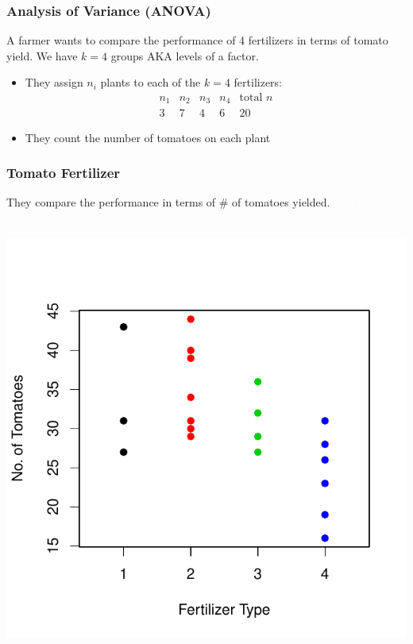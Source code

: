\documentclass[handout]{beamer}
\newcommand{\blue}[1]{\textcolor{blue2}{#1}}
\begin{document}
\begin{frame}[fragile]
\frametitle{Analysis of Variance (ANOVA)}

A farmer wants to compare the performance of 4 fertilizers in terms of tomato yield.   We have $k=4$ groups AKA \blue{levels of a factor}.

\begin{itemize}
\pause\item They assign $n_i$ plants to each of the $k=4$ fertilizers:
\[
\begin{array}{cccc|c}
n_1 & n_2 & n_3 & n_4 &\mbox{total }n\\
\hline
3 & 7 & 4 & 6 & 20
\end{array}
\]
\pause\item They count the number of tomatoes on each plant
\end{itemize}

\end{frame}


\begin{frame}
\frametitle{Tomato Fertilizer}
They compare the performance in terms of \# of tomatoes yielded. \textcolor{white}{Plot the sample mean of each level.} \textcolor{white}{Question: are the mean tomato yields different?}  
\begin{center}
\includegraphics{figure/lec22-003}
\end{center}
\end{frame}
\end{document}
